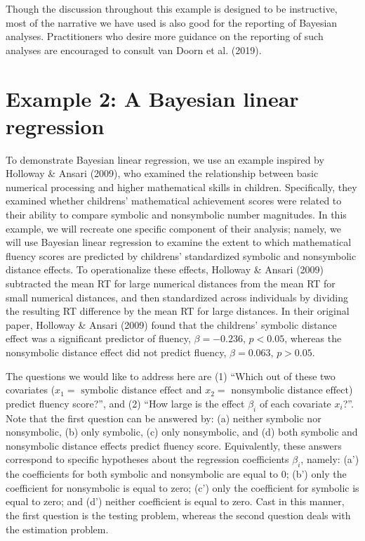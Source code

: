 \documentclass[english,,doc,floatsintext]{apa6}
\begin{document}
Though the discussion throughout this example is designed to be instructive, most of the narrative we have used is also good for the reporting of Bayesian analyses. Practitioners who desire more guidance on the reporting of such analyses are encouraged to consult van Doorn et al. (2019).

\hypertarget{example-2-a-bayesian-linear-regression}{%
\section{Example 2: A Bayesian linear regression}\label{example-2-a-bayesian-linear-regression}}

To demonstrate Bayesian linear regression, we use an example inspired by Holloway \& Ansari (2009), who examined the relationship between basic numerical processing and higher mathematical skills in children. Specifically, they examined whether childrens' mathematical achievement scores were related to their ability to compare symbolic and nonsymbolic number magnitudes. In this example, we will recreate one specific component of their analysis; namely, we will use Bayesian linear regression to examine the extent to which mathematical fluency scores are predicted by childrens' standardized symbolic and nonsymbolic distance effects. To operationalize these effects, Holloway \& Ansari (2009) subtracted the mean RT for large numerical distances from the mean RT for small numerical distances, and then standardized across individuals by dividing the resulting RT difference by the mean RT for large distances. In their original paper, Holloway \& Ansari (2009) found that the childrens' symbolic distance effect was a significant predictor of fluency, \(\beta = -0.236\), \(p<0.05\), whereas the nonsymbolic distance effect did not predict fluency, \(\beta=0.063\), \(p > 0.05\).

The questions we would like to address here are (1) \enquote{Which out of these two covariates (\(x_{1}=\text{ symbolic distance effect}\) and \(x_{2}=\text{ nonsymbolic distance effect}\)) predict fluency score?}, and (2) \enquote{How large is the effect \(\beta_{i}\) of each covariate \(x_{i}\)?}. Note that the first question can be answered by: (a) neither symbolic nor nonsymbolic, (b) only symbolic, (c) only nonsymbolic, and (d) both symbolic and nonsymbolic distance effects predict fluency score. Equivalently, these answers correspond to specific hypotheses about the regression coefficients \(\beta_{i}\), namely: (a') the coefficients for both symbolic and nonsymbolic are equal to 0; (b') only the coefficient for nonsymbolic is equal to zero; (c') only the coefficient for symbolic is equal to zero; and (d') neither coefficient is equal to zero. Cast in this manner, the first question is the testing problem, whereas the second question deals with the estimation problem.
\end{document}
